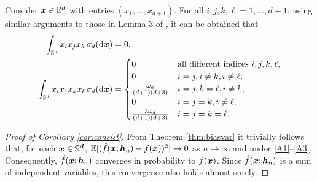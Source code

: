 \documentclass[oneside,11pt]{article}
\begin{document}
\begin{remark}\label{rem:int:prod}
Consider $\boldsymbol{x} \in \mathbb{S}^{d}$ with entries $\left(x_1, \ldots, x_{d+1}\right)$. For all $i, j,k,\ell=1, \ldots, d+1$, using similar arguments to those in Lemma 3 of \cite{Garcia-Portugues2013b}, it can be obtained that
\begin{align*}
%
%
\int_{\Sd} x_i x_j x_k\,\sigma_d(\rd \bx)&=0,\\ %
\int_{\Sd} x_i x_j x_k x_\ell\,\sigma_d(\rd \bx)&= \begin{cases} 0& \text{all different indices }i, j, k, \ell, \\0  & i=j,i\neq k, i\neq \ell, \\ \frac{\omega_{d}}{(d+1)(d+3)} & i=j,k=\ell,i\neq k,\\ 0 & i=j=k,i\neq \ell,\\
\frac{3\omega_d}{(d+1)(d+3)} & i=j=k=\ell.\end{cases}
\end{align*}
\end{remark}

\begin{proof}[Proof of Corollary \ref{cor:consist}]
From Theorem \ref{thm:biasvar} it trivially follows that, for each $\boldsymbol{x}\in\mathbb{S}^{\boldsymbol{d}}$, $\mathbb{E}[(\hat{f}(\boldsymbol{x};{\boldsymbol{h}}_n)- f(\boldsymbol{x}))^2]\to0$ as $n\to\infty$ and under \ref{A1}--\ref{A3}. Consequently, $\hat{f}(\boldsymbol{x};{\boldsymbol{h}}_n)$ converges in probability to $f(\boldsymbol{x})$. Since $\hat{f}(\boldsymbol{x};{\boldsymbol{h}}_n)$ is a sum of independent variables, this convergence also holds almost surely.
\end{proof}
\end{document}
